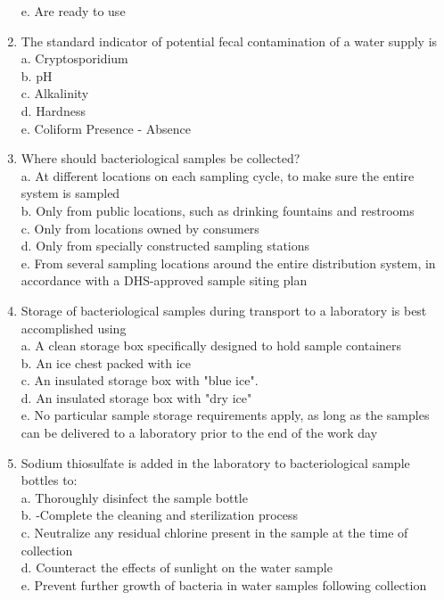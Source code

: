 \begin{enumerate}[1.]
e. Are ready to use\\
\item The standard indicator of potential fecal contamination of a water supply is\\
a. Cryptosporidium\\
b. $\mathrm{pH}$\\
c. Alkalinity\\
d. Hardness\\
e. Coliform Presence - Absence\\
\item Where should bacteriological samples be collected?\\
a. At different locations on each sampling cycle, to make sure the entire system is sampled\\
b. Only from public locations, such as drinking fountains and restrooms\\
c. Only from locations owned by consumers\\
d. Only from specially constructed sampling stations\\
e. From several sampling locations around the entire distribution system, in accordance with a DHS-approved sample siting plan\\
\item Storage of bacteriological samples during transport to a laboratory is best accomplished using\\
a. A clean storage box specifically designed to hold sample containers\\
b. An ice chest packed with ice\\
c. An insulated storage box with "blue ice".\\
d. An insulated storage box with "dry ice"\\
e. No particular sample storage requirements apply, as long as the samples can be delivered to a laboratory prior to the end of the work day\\
\item Sodium thiosulfate is added in the laboratory to bacteriological sample bottles to:\\
a. Thoroughly disinfect the sample bottle\\
b. -Complete the cleaning and sterilization process\\
c. Neutralize any residual chlorine present in the sample at the time of collection\\
d. Counteract the effects of sunlight on the water sample\\
e. Prevent further growth of bacteria in water samples following collection\\


\end{enumerate}
